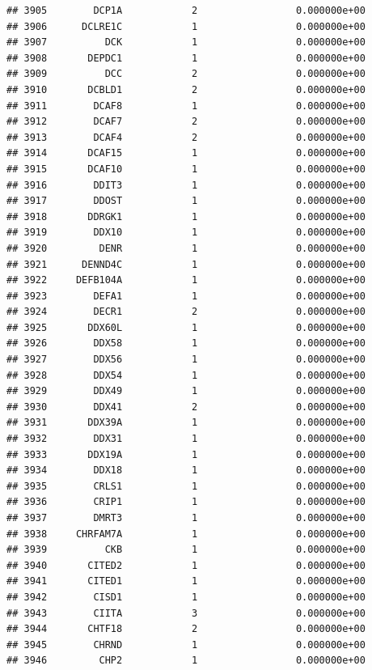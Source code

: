 \documentclass[
]{article}
\begin{document}
\begin{verbatim}
## 3905        DCP1A            2                 0.000000e+00
## 3906      DCLRE1C            1                 0.000000e+00
## 3907          DCK            1                 0.000000e+00
## 3908       DEPDC1            1                 0.000000e+00
## 3909          DCC            2                 0.000000e+00
## 3910       DCBLD1            2                 0.000000e+00
## 3911        DCAF8            1                 0.000000e+00
## 3912        DCAF7            2                 0.000000e+00
## 3913        DCAF4            2                 0.000000e+00
## 3914       DCAF15            1                 0.000000e+00
## 3915       DCAF10            1                 0.000000e+00
## 3916        DDIT3            1                 0.000000e+00
## 3917        DDOST            1                 0.000000e+00
## 3918       DDRGK1            1                 0.000000e+00
## 3919        DDX10            1                 0.000000e+00
## 3920         DENR            1                 0.000000e+00
## 3921      DENND4C            1                 0.000000e+00
## 3922     DEFB104A            1                 0.000000e+00
## 3923        DEFA1            1                 0.000000e+00
## 3924        DECR1            2                 0.000000e+00
## 3925       DDX60L            1                 0.000000e+00
## 3926        DDX58            1                 0.000000e+00
## 3927        DDX56            1                 0.000000e+00
## 3928        DDX54            1                 0.000000e+00
## 3929        DDX49            1                 0.000000e+00
## 3930        DDX41            2                 0.000000e+00
## 3931       DDX39A            1                 0.000000e+00
## 3932        DDX31            1                 0.000000e+00
## 3933       DDX19A            1                 0.000000e+00
## 3934        DDX18            1                 0.000000e+00
## 3935        CRLS1            1                 0.000000e+00
## 3936        CRIP1            1                 0.000000e+00
## 3937        DMRT3            1                 0.000000e+00
## 3938     CHRFAM7A            1                 0.000000e+00
## 3939          CKB            1                 0.000000e+00
## 3940       CITED2            1                 0.000000e+00
## 3941       CITED1            1                 0.000000e+00
## 3942        CISD1            1                 0.000000e+00
## 3943        CIITA            3                 0.000000e+00
## 3944       CHTF18            2                 0.000000e+00
## 3945        CHRND            1                 0.000000e+00
## 3946         CHP2            1                 0.000000e+00

\end{verbatim}
\end{document}
